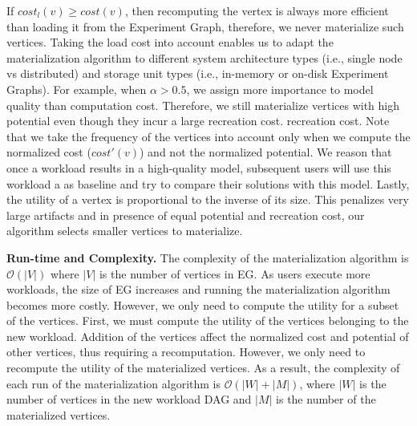 If $cost_l(v) \ge cost(v)$, then recomputing the vertex is always more efficient than loading it from the Experiment Graph, therefore, we never materialize such vertices.
Taking the load cost into account enables us to adapt the materialization algorithm to different system architecture types (i.e., single node vs distributed) and storage unit types (i.e., in-memory or on-disk Experiment Graphs).
For example, when $\alpha > 0.5$, we assign more importance to model quality than computation cost.
Therefore, we still materialize vertices with high potential even though they incur a large recreation cost. recreation cost.
Note that we take the frequency of the vertices into account only when we compute the normalized cost ($cost'(v)$) and not the normalized potential.
We reason that once a workload results in a high-quality model, subsequent users will use this workload a as baseline and try to compare their solutions with this model.
Lastly, the utility of a vertex is proportional to the inverse of its size.
This penalizes very large artifacts and in presence of equal potential and recreation cost, our algorithm selects smaller vertices to materialize.

\textbf{Run-time and Complexity.}
The complexity of the materialization algorithm is $\mathcal{O}(|V|)$ where $|V|$ is the number of vertices in EG.
As users execute more workloads, the size of EG increases and running the materialization algorithm becomes more costly.
However, we only need to compute the utility for a subset of the vertices. 
First, we must compute the utility of the vertices belonging to the new workload.
Addition of the vertices affect the normalized cost and potential of other vertices, thus requiring a recomputation.
However, we only need to recompute the utility of the materialized vertices.
As a result, the complexity of each run of the materialization algorithm is $\mathcal{O}(|W| + |M|)$, where $|W|$ is the number of vertices in the new workload DAG and $|M|$ is the number of the materialized vertices.

